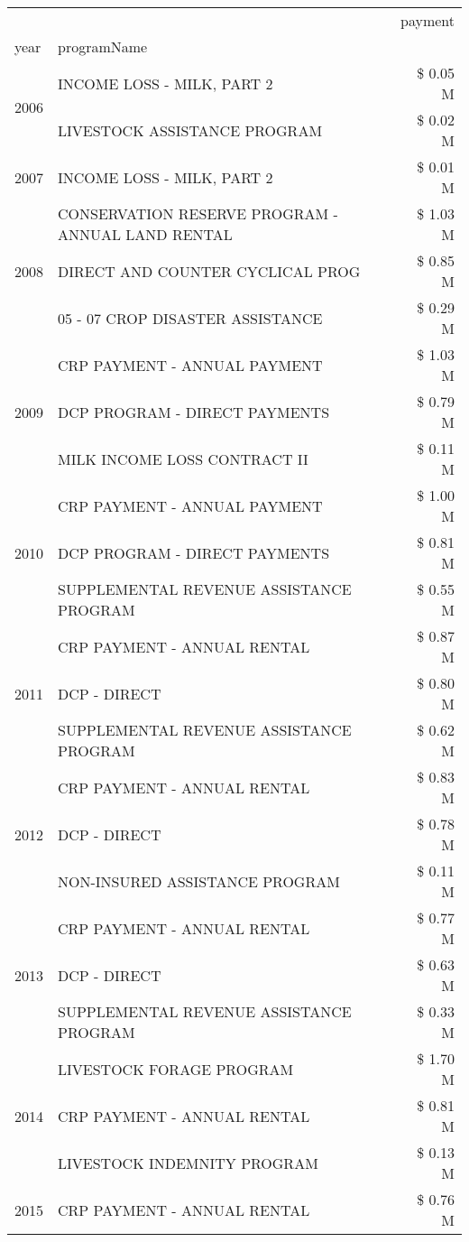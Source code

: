 \begin{tabular}{llr}
\toprule
 &  & payment \\
year & programName &  \\
\midrule
\multirow[t]{2}{*}{2006} & INCOME LOSS - MILK, PART 2 & \$ 0.05 M \\
 & LIVESTOCK ASSISTANCE PROGRAM & \$ 0.02 M \\
\cline{1-3}
2007 & INCOME LOSS - MILK, PART 2 & \$ 0.01 M \\
\cline{1-3}
\multirow[t]{3}{*}{2008} & CONSERVATION RESERVE PROGRAM - ANNUAL LAND RENTAL & \$ 1.03 M \\
 & DIRECT AND COUNTER CYCLICAL PROG & \$ 0.85 M \\
 & 05 - 07 CROP DISASTER ASSISTANCE & \$ 0.29 M \\
\cline{1-3}
\multirow[t]{3}{*}{2009} & CRP PAYMENT - ANNUAL PAYMENT & \$ 1.03 M \\
 & DCP PROGRAM - DIRECT PAYMENTS & \$ 0.79 M \\
 & MILK INCOME LOSS CONTRACT II & \$ 0.11 M \\
\cline{1-3}
\multirow[t]{3}{*}{2010} & CRP PAYMENT - ANNUAL PAYMENT & \$ 1.00 M \\
 & DCP PROGRAM - DIRECT PAYMENTS & \$ 0.81 M \\
 & SUPPLEMENTAL REVENUE ASSISTANCE PROGRAM & \$ 0.55 M \\
\cline{1-3}
\multirow[t]{3}{*}{2011} & CRP PAYMENT - ANNUAL RENTAL & \$ 0.87 M \\
 & DCP - DIRECT & \$ 0.80 M \\
 & SUPPLEMENTAL REVENUE ASSISTANCE PROGRAM & \$ 0.62 M \\
\cline{1-3}
\multirow[t]{3}{*}{2012} & CRP PAYMENT - ANNUAL RENTAL & \$ 0.83 M \\
 & DCP - DIRECT & \$ 0.78 M \\
 & NON-INSURED ASSISTANCE PROGRAM & \$ 0.11 M \\
\cline{1-3}
\multirow[t]{3}{*}{2013} & CRP PAYMENT - ANNUAL RENTAL & \$ 0.77 M \\
 & DCP - DIRECT & \$ 0.63 M \\
 & SUPPLEMENTAL REVENUE ASSISTANCE PROGRAM & \$ 0.33 M \\
\cline{1-3}
\multirow[t]{3}{*}{2014} & LIVESTOCK FORAGE PROGRAM & \$ 1.70 M \\
 & CRP PAYMENT - ANNUAL RENTAL & \$ 0.81 M \\
 & LIVESTOCK INDEMNITY PROGRAM & \$ 0.13 M \\
\cline{1-3}
\multirow[t]{3}{*}{2015} & CRP PAYMENT - ANNUAL RENTAL & \$ 0.76 M \\

\end{tabular}
